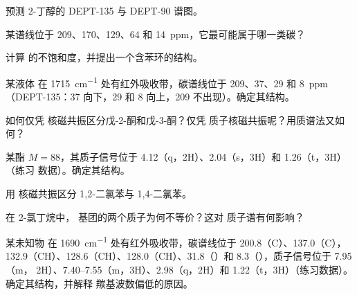 \begin{exercise}[$\star$]\label{exo:b2:structure-determination:2}
预测 2-丁醇的 DEPT-135 与 DEPT-90 谱图。
\end{exercise}

\begin{exercise}[$\star$]\label{exo:b2:structure-determination:3}
某谱线位于 209、170、129、64 和 14~ppm，它最可能属于哪一类碳？
\end{exercise}

\begin{exercise}[$\star$]\label{exo:b2:structure-determination:4}
计算  的不饱和度，并提出一个含苯环的结构。
\end{exercise}

\begin{exercise}[$\star\star$]\label{exo:b2:structure-determination:5}
某液体  在 \qty{1715}{cm^{-1}} 处有红外吸收带，碳谱线位于 209、37、29 和 8~ppm
（DEPT-135：37 向下，29 和 8 向上，209 不出现）。确定其结构。
\end{exercise}

\begin{exercise}[$\star\star$]\label{exo:b2:structure-determination:6}
如何仅凭  核磁共振区分戊-2-酮和戊-3-酮？仅凭
质子核磁共振呢？用质谱法又如何？
\end{exercise}

\begin{exercise}[$\star\star$]\label{exo:b2:structure-determination:7}
某酯 $M = 88$，其质子信号位于 4.12（q，2H）、2.04（s，3H）和 1.26（t，3H）（练习
数据）。确定其结构。
\end{exercise}

\begin{exercise}[$\star\star$]\label{exo:b2:structure-determination:8}
用  核磁共振区分 1,2-二氯苯与 1,4-二氯苯。
\end{exercise}

\begin{exercise}[$\star\star$]\label{exo:b2:structure-determination:9}
在 2-氯丁烷中， 基团的两个质子为何不等价？这对
质子谱有何影响？
\end{exercise}

\begin{exercise}[$\star\star\star$]\label{exo:b2:structure-determination:10}
某未知物  在 \qty{1690}{cm^{-1}} 处有红外吸收带，碳谱线位于 200.8（C）、137.0（C），
132.9（CH）、128.6（CH）、128.0（CH）、31.8（）和 8.3（），质子信号位于 7.95（m，
2H）、7.40--7.55（m，3H）、2.98（q，2H）和 1.22（t，3H）（练习数据）。确定其结构，并解释
羰基波数偏低的原因。
\end{exercise}


